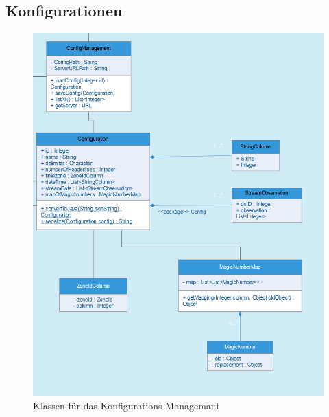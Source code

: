 \subsection{Konfigurationen}
\begin{figure}[!h]
\centering
\includegraphics[scale=0.6]{uml/screenshots/configuration}
\caption{Klassen für das Konfigurations-Managemant}
\end{figure}
\clearpage


\clearpage

\clearpage



\clearpage
